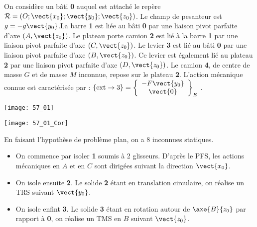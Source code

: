 \normalfalse \difficiletrue \tdifficilefalse
\correctiontrue


\setcounter{question}{0}%
\ifcorrection
\else
{}
\fi

\ifprof
\else
On considère un bâti \textbf{0} auquel est attaché le repère$\mathcal{R}=\left(O;\vect{x_0};\vect{y_0};\vect{z_0} \right)$. Le champ de pesanteur est $g=-g\vect{y_0}$.La barre \textbf{1} est liée au bâti \textbf{0} par une liaison pivot parfaite d’axe $\left(A,\vect{z_0}\right)$. Le plateau porte camion \textbf{2} est lié à la barre \textbf{1} par une liaison pivot parfaite d’axe $\left(C,\vect{z_0}\right)$. Le levier \textbf{3} est lié au bâti \textbf{0} par une liaison pivot parfaite d’axe $\left(B,\vect{z_0}\right)$. Ce levier est également lié au plateau \textbf{2} par une liaison pivot parfaite d’axe $\left(D,\vect{z_0}\right)$. Le camion \textbf{4}, de centre de masse $G$ et de masse $M$ inconnue, repose sur le plateau \textbf{2}.
L’action mécanique connue est caractérisée par : $\{\text{ext}\rightarrow 3\}=\left\{
\begin{array}{c}
-F\vect{y_0} \\
\vect{0} \\
\end{array}
\right\}_E$ .


\begin{marginfigure}
\texttt{[image: 57\_01]}
\end{marginfigure}


\fi

\ifprof

\begin{marginfigure}
\texttt{[image: 57\_01\_Cor]}
\end{marginfigure}

En faisant l'hypothèse de problème plan, on a 8 inconnues statiques. 
\else
\fi



\ifprof
\begin{itemize}
\item On commence par isoler \textbf{1} soumis à 2 glisseurs. D'après le PFS, les actions mécaniques en $A$ et en $C$ sont dirigées suivant la direction $\vect{x_0}$.
\item On isole ensuite \textbf{2}. Le solide \textbf{2} étant en translation circulaire, on réalise un TRS suivant $\vect{y_0}$. 
\item On isole enfint \textbf{3}. Le solide \textbf{3} étant en rotation autour de $\axe{B}{z_0}$ par rapport à \textbf{0},  on réalise un TMS en $B$ suivant $\vect{z_0}$. 
\end{itemize}
\else
\fi
\ifprof
\else


\fi